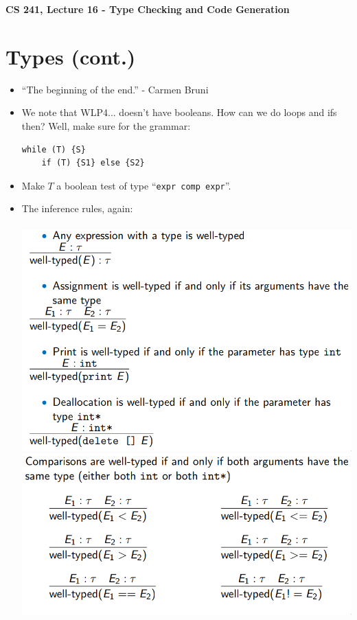 \documentclass[12pt]{article}
\author{Clement Tsang}
\begin{document}
\begin{center}
    \Large\textbf{CS 241, Lecture 16 - Type Checking and Code Generation}
\end{center}

\section{Types (cont.)}
\begin{itemize}
    \item ``The beginning of the end.'' - Carmen Bruni
    \item We note that WLP4... doesn't have booleans.  How can we do loops and ifs then?  Well, make sure for the grammar:
    \begin{lstlisting}[mathescape, numbers=none, breaklines=true]
    while (T) {S}
    if (T) {S1} else {S2}
    \end{lstlisting}
    \item Make $T$ a boolean test of type ``\lstinline[mathescape]{expr comp expr}''.
    \item The inference rules, again: \\\\
    \includegraphics[scale=0.4]{inference1.png}\\
    \includegraphics[scale=0.4]{inference2.png}\\

\end{itemize}
\end{document}
